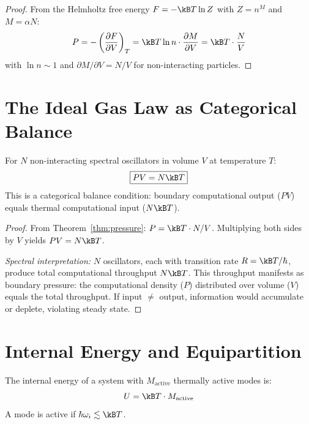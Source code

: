 \begin{proof}
From the Helmholtz free energy $F = -\kB T \ln Z$ with $Z = n^M$ and $M = \alpha N$:
\begin{equation}
    P = -\left(\frac{\partial F}{\partial V}\right)_T = \kB T \ln n \cdot \frac{\partial M}{\partial V} = \kB T \cdot \frac{N}{V}
\end{equation}
with $\ln n \sim 1$ and $\partial M/\partial V = N/V$ for non-interacting particles.
\end{proof}

\section{The Ideal Gas Law as Categorical Balance}
\label{sec:ideal_gas}

\begin{theorem}
\label{thm:ideal_gas}
For $N$ non-interacting spectral oscillators in volume $V$ at temperature $T$:
\begin{equation}
\boxed{PV = N\kB T}
\end{equation}
This is a categorical balance condition: boundary computational output ($PV$) equals thermal computational input ($N\kB T$).
\end{theorem}

\begin{proof}
From Theorem~\ref{thm:pressure}: $P = \kB T \cdot N/V$. Multiplying both sides by $V$ yields $PV = N\kB T$.

\emph{Spectral interpretation:} $N$ oscillators, each with transition rate $R = \kB T/\hbar$, produce total computational throughput $N\kB T$. This throughput manifests as boundary pressure: the computational density ($P$) distributed over volume ($V$) equals the total throughput. If input $\neq$ output, information would accumulate or deplete, violating steady state.
\end{proof}

\section{Internal Energy and Equipartition}
\label{sec:energy}

\begin{theorem}
\label{thm:energy}
The internal energy of a system with $M_{\mathrm{active}}$ thermally active modes is:
\begin{equation}
    U = \kB T \cdot M_{\mathrm{active}}
\end{equation}
A mode is active if $\hbar\omega_i \lesssim \kB T$.
\end{theorem}

